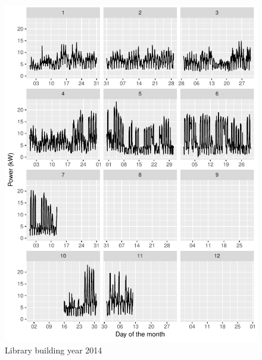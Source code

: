\documentclass[11pt, oneside]{article}   	%
\begin{document}
\begin{figure}
\includegraphics[keepaspectratio]{library_build_Y2014.pdf}
\caption{Library building year 2014 }
\end{figure}
\end{document}

